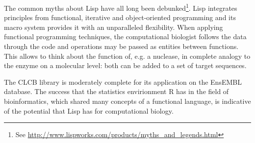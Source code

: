 \documentclass{bioinfo}
\begin{document}
The common myths about Lisp have all long been debunked\footnote{See
\href{http://www.lispworks.com/products/myths\_and\_legends.html}{http://www.lispworks.com/products/myths\_and\_legends.html}}.
Lisp integrates principles from functional, iterative and object-oriented
programming and its macro system provides it with an unparalleled
flexibility. When applying functional programming techniques, the computational biologist
follows the data through the code and operations may be passed as
entities between functions. This allows to
think about the function of, e.g. a nuclease, in complete analogy to
the enzyme on a molecular level: both can be added to a set of target
sequences.

The CLCB library is moderately complete for its application on the EnsEMBL
database. The success that the statistics envirionment R \citep{Rbioinformatics}
has in the field of bioinformatics, which shared many concepts of a
functional language, is indicative of the potential that Lisp has for
computational biology.



\begin{methods}

\end{methods}
\end{document}
